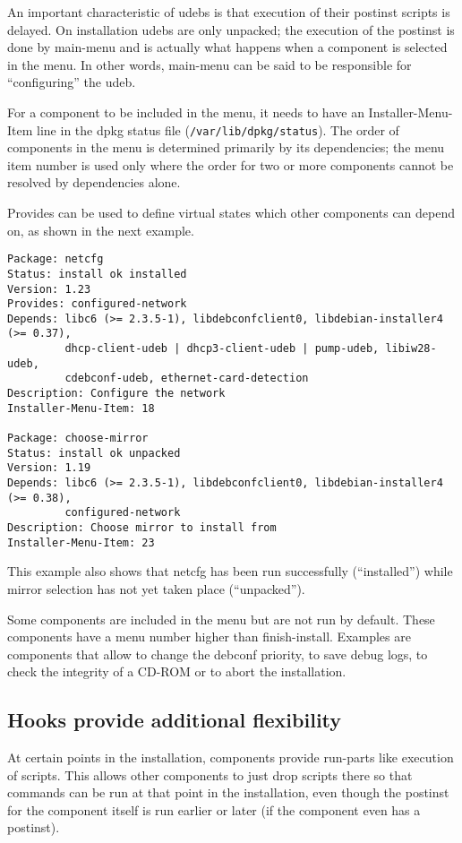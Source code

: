 \documentclass[a4paper,10pt]{article}
\begin{document}
An important characteristic of udebs is that execution of their postinst scripts is delayed. On installation udebs are only unpacked; the execution of the postinst is done by main-menu and is actually what happens when a component is selected in the menu. In other words, main-menu can be said to be responsible for “configuring” the udeb. 

For a component to be included in the menu, it needs to have an Installer-Menu-Item line in the dpkg status file (\texttt{/var/lib/dpkg/status}). The order of components in the menu is determined primarily by its dependencies; the menu item number is used only where the order for two or more components cannot be resolved by dependencies alone. 

Provides can be used to define virtual states which other components can depend on, as shown in the next example. 

\begin{verbatim}
Package: netcfg
Status: install ok installed
Version: 1.23
Provides: configured-network
Depends: libc6 (>= 2.3.5-1), libdebconfclient0, libdebian-installer4 (>= 0.37),
         dhcp-client-udeb | dhcp3-client-udeb | pump-udeb, libiw28-udeb,
         cdebconf-udeb, ethernet-card-detection
Description: Configure the network
Installer-Menu-Item: 18

Package: choose-mirror
Status: install ok unpacked
Version: 1.19
Depends: libc6 (>= 2.3.5-1), libdebconfclient0, libdebian-installer4 (>= 0.38),
         configured-network
Description: Choose mirror to install from
Installer-Menu-Item: 23
\end{verbatim}

This example also shows that netcfg has been run successfully (“installed”) while mirror selection has not yet taken place (“unpacked”). 

Some components are included in the menu but are not run by default. These components have a menu number higher than finish-install. Examples are components that allow to change the debconf priority, to save debug logs, to check the integrity of a CD-ROM or to abort the installation. 


\subsection{Hooks provide additional flexibility}
At certain points in the installation, components provide run-parts like execution of scripts. This allows other components to just drop scripts there so that commands can be run at that point in the installation, even though the postinst for the component itself is run earlier or later (if the component even has a postinst). 
\end{document}
